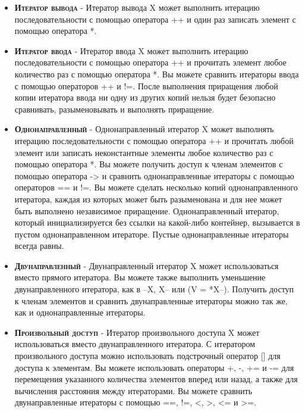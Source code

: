 \documentclass[a4paper,10pt]{article}
\begin{document}
\begin{itemize}
\item \textbf{\textsc{Итератор вывода}} - Итератор вывода X может выполнить итерацию последовательности с помощью оператора ++ и один раз записать элемент с помощью оператора *.
\\

\item \textbf{\textsc{Итератор ввода}} - Итератор ввода X может выполнить итерацию последовательности с помощью оператора ++ и прочитать элемент любое количество раз с помощью оператора *. Вы можете сравнить итераторы ввода с помощью операторов ++ и !=. После выполнения приращения любой копии итератора ввода ни одну из других копий нельзя будет безопасно сравнивать, разыменовывать и выполнять приращение.
\\

\item \textbf{\textsc{Однонаправленный}} - Однонаправленный итератор X может выполнять итерацию последовательности с помощью оператора ++ и прочитать любой элемент или записать неконстантные элементы любое количество раз с помощью оператора *. Вы можете получить доступ к членам элементов с помощью оператора -> и сравнить однонаправленные итераторы с помощью операторов == и !=. Вы можете сделать несколько копий однонаправленного итератора, каждая из которых может быть разыменована и для нее может быть выполнено независимое приращение. Однонаправленный итератор, который инициализируется без ссылки на какой-либо контейнер, вызывается в пустом однонаправленном итераторе. Пустые однонаправленные итераторы всегда равны.
\\

\item \textbf{\textsc{Двунаправленный}} - Двунаправленный итератор X может использоваться вместо прямого итератора. Вы можете также выполнить уменьшение двунаправленного итератора, как в --X, X-- или (V = *X--). Получить доступ к членам элементов и сравнить двунаправленные итераторы можно так же, как и однонаправленные итераторы.
\\

\item \textbf{\textsc{Произвольный доступ}} - Итератор произвольного доступа X может использоваться вместо двунаправленного итератора. С итератором произвольного доступа можно использовать подстрочный оператор [] для доступа к элементам. Вы можете использовать операторы +, -, += и -= для перемещения указанного количества элементов вперед или назад, а также для вычисления расстояния между итераторами. Вы можете сравнить двунаправленные итераторы с помощью ==, !=, <, >, <= и >=.
\\
\end{itemize}
\end{document}
